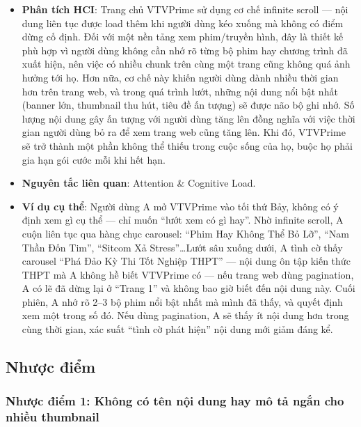 \begin{itemize}
  \item \textbf{Phân tích HCI}: Trang chủ VTVPrime sử dụng cơ chế infinite scroll --- nội dung liên tục được load thêm khi người dùng kéo xuống mà không có điểm dừng cố định. Đối với một nền tảng xem phim/truyền hình, đây là thiết kế phù hợp vì người dùng không cần nhớ rõ từng bộ phim hay chương trình đã xuất hiện, nên việc có nhiều chunk trên cùng một trang cũng không quá ảnh hưởng tới họ. Hơn nữa, cơ chế này khiến người dùng dành nhiều thời gian hơn trên trang web, và trong quá trình lướt, những nội dung nổi bật nhất (banner lớn, thumbnail thu hút, tiêu đề ấn tượng) sẽ được não bộ ghi nhớ. Số lượng nội dung gây ấn tượng với người dùng tăng lên đồng nghĩa với việc thời gian người dùng bỏ ra để xem trang web cũng tăng lên. Khi đó, VTVPrime sẽ trở thành một phần không thể thiếu trong cuộc sống của họ, buộc họ phải gia hạn gói cước mỗi khi hết hạn.
  \item \textbf{Nguyên tắc liên quan}: Attention \& Cognitive Load.
  \item \textbf{Ví dụ cụ thể}: Người dùng A mở VTVPrime vào tối thứ Bảy, không có ý định xem gì cụ thể --- chỉ muốn ``lướt xem có gì hay''. Nhờ infinite scroll, A cuộn liên tục qua hàng chục carousel: ``Phim Hay Không Thể Bỏ Lỡ'', ``Nam Thần Đốn Tim'', ``Sitcom Xả Stress''\ldots Lướt sâu xuống dưới, A tình cờ thấy carousel ``Phá Đảo Kỳ Thi Tốt Nghiệp THPT'' --- nội dung ôn tập kiến thức THPT mà A không hề biết VTVPrime có --- nếu trang web dùng pagination, A có lẽ đã dừng lại ở ``Trang 1'' và không bao giờ biết đến nội dung này. Cuối phiên, A nhớ rõ 2--3 bộ phim nổi bật nhất mà mình đã thấy, và quyết định xem một trong số đó. Nếu dùng pagination, A sẽ thấy ít nội dung hơn trong cùng thời gian, xác suất ``tình cờ phát hiện'' nội dung mới giảm đáng kể.
\end{itemize}

\subsection{Nhược điểm}

\subsubsection{Nhược điểm 1: Không có tên nội dung hay mô tả ngắn cho nhiều thumbnail}

